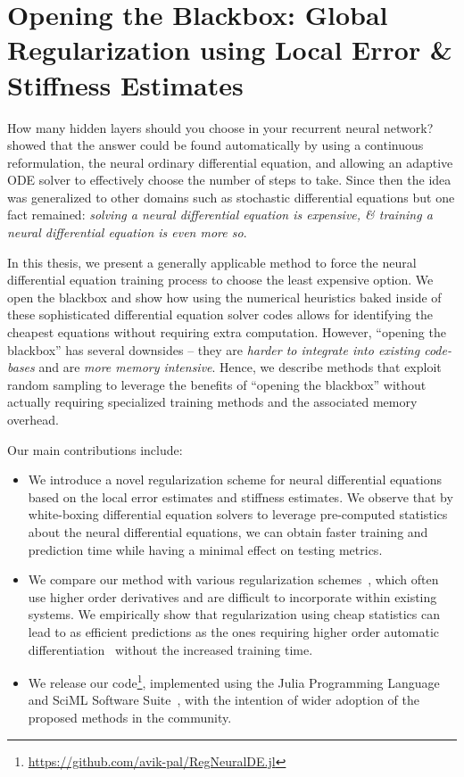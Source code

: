 \chapter{Opening the Blackbox: Global Regularization using Local Error \& Stiffness Estimates}
\label{chapter:internal_solver_heuristics_regularized_neural_des}

How many hidden layers should you choose in your recurrent neural network? \citet{chen2018neural} showed that the answer could be found automatically by using a continuous reformulation, the neural ordinary differential equation, and allowing an adaptive ODE solver to effectively choose the number of steps to take. Since then the idea was generalized to other domains such as stochastic differential equations \citep{liu2019neural, rackauckas2020universal} but one fact remained: \textit{solving a neural differential equation is expensive, \& training a neural differential equation is even more so}.

In this thesis, we present a generally applicable method to force the neural differential equation training process to choose the least expensive option. We open the blackbox and show how using the numerical heuristics baked inside of these sophisticated differential equation solver codes allows for identifying the cheapest equations without requiring extra computation. However, ``opening the blackbox'' has several downsides -- they are \textit{harder to integrate into existing code-bases} and are \textit{more memory intensive}. Hence, we describe methods that exploit random sampling to leverage the benefits of ``opening the blackbox'' without actually requiring specialized training methods and the associated memory overhead.

Our main contributions include:
\begin{itemize}
  \item We introduce a novel regularization scheme for neural differential equations based on the local error estimates and stiffness estimates. We observe that by white-boxing differential equation solvers to leverage pre-computed statistics about the neural differential equations, we can obtain faster training and prediction time while having a minimal effect on testing metrics.
  \item We compare our method with various regularization schemes~\citep{kelly2020learning, ghosh2020steer}, which often use higher order derivatives and are difficult to incorporate within existing systems. We empirically show that regularization using cheap statistics can lead to as efficient predictions as the ones requiring higher order automatic differentiation~\citep{kelly2020learning, finlay2020train} without the increased training time.
  \item We release our code\footnote{\url{https://github.com/avik-pal/RegNeuralDE.jl}}, implemented using the Julia Programming Language~\citep{Julia-2017} and SciML Software Suite~\citep{rackauckas2019diffeqflux}, with the intention of wider adoption of the proposed methods in the community.
\end{itemize}

